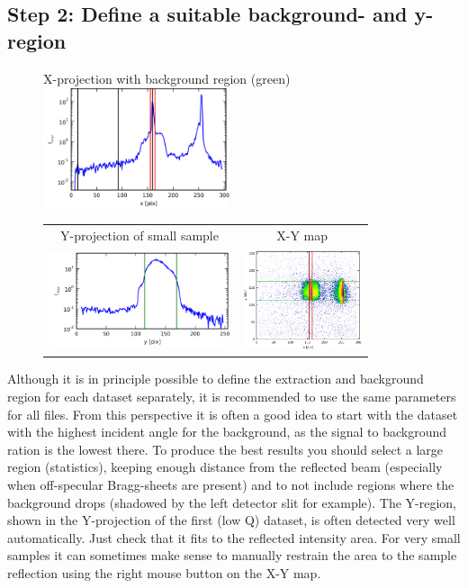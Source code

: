   
  \subsection{Step 2: Define a suitable background- and y-region}
    \begin{figure}
    \centering
      X-projection with background region (green)\\
      \includegraphics[width=155pt]{screenshots/background.png}
    \begin{tabular}{cc}
        Y-projection of small sample & X-Y map \\
      \includegraphics[width=150pt]{screenshots/yregion.png} & \includegraphics[width=100pt]{screenshots/yregionmap.png}
    \end{tabular}     
    \end{figure}
  
    Although it is in principle possible to define the extraction and background region for each dataset separately, it is recommended to use the same parameters for all files.
    From this perspective it is often a good idea to start with the dataset with the highest incident angle for the background, as the signal to background ration is the lowest there.
    To produce the best results you should select a large region (statistics), keeping enough distance from the reflected beam (especially when off-specular Bragg-sheets are present) and to not include regions where the background drops (shadowed by the left detector slit for example).
    The Y-region, shown in the Y-projection of the first (low Q) dataset, is often detected very well automatically.
    Just check that it fits to the reflected intensity area. 
    For very small samples it can sometimes make sense to manually restrain the area to the sample reflection using the right mouse button on the X-Y map.
  
